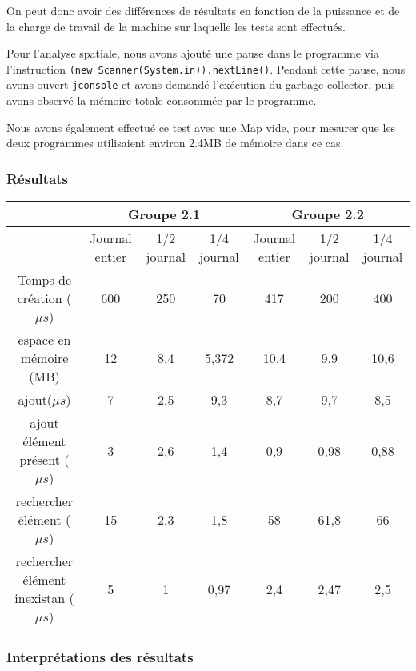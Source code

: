 \documentclass[a4paper,10pt]{article}
\begin{document}
	On peut donc avoir des différences de résultats en fonction de la puissance et de la charge de travail de la machine sur laquelle les tests sont effectués.
	
	Pour l'analyse spatiale, nous avons ajouté une pause dans le programme via l'instruction \texttt{(new Scanner(System.in)).nextLine()}. Pendant cette pause, nous avons ouvert \texttt{jconsole} et avons demandé l'exécution du garbage collector, puis avons observé la mémoire totale consommée par le programme.

	Nous avons également effectué ce test avec une Map vide, pour mesurer que les deux programmes utilisaient environ 2.4MB de mémoire dans ce cas.

 

\subsubsection{Résultats}

\begin{center}

\begin{tabular}{|c|c|c|c|c|c|c|}
   \hline 
    & \multicolumn{3}{c|}{{\tiny Groupe 2.1}} &\multicolumn{3}{c|}{{\tiny Groupe 2.2}} \\ 
   \hline 
    &{\tiny  Journal entier} &{\tiny  1/2 journal }& {\tiny 1/4 journal} &{\tiny  Journal entier} & {\tiny 1/2 journal }&{\tiny  1/4 journal} \\ 
   \hline 
  {\tiny  Temps de création ($\mu s$)} & 600 & 250 & 70 & 417 & 200 & 400 \\ 
   \hline 
   {\tiny espace en mémoire (MB)} & 12  & 8,4  & 5,372  & 10,4  & 9,9  & 10,6  \\ 
   \hline 
   {\tiny ajout($\mu s$)}& 7 & 2,5 & 9,3 & 8,7 & 9,7 & 8,5 \\ 
   \hline 
   {\tiny ajout élément présent ($\mu s$)} & 3 & 2,6 & 1,4 & 0,9 & 0,98 & 0,88 \\ 
   \hline 
  {\tiny  rechercher élément ($\mu s$)} & 15 & 2,3 & 1,8 & 58 & 61,8 & 66 \\ 
   \hline 
  {\tiny  rechercher élément inexistan ($\mu s$)} & 5 & 1 & 0,97 & 2,4 & 2,47 & 2,5 \\ 
   \hline 
   \end{tabular}   
     
\end{center} 

\subsubsection{Interprétations des résultats}
\end{document}
